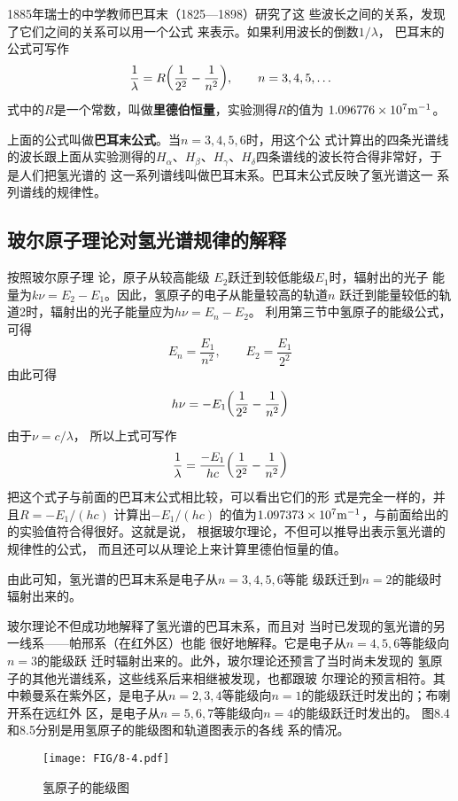1885年瑞士的中学教师巴耳末（1825—1898）研究了这
些波长之间的关系，发现了它们之间的关系可以用一个公式
来表示。如果利用波长的倒数$1/\lambda$，
巴耳末的公式可写作
\[\frac{1}{\lambda}=R\qty(\frac{1}{2^2}-\frac{1}{n^2}),\qquad n=3,4,5,\ldots\]
式中的$R$是一个常数，叫做\textbf{里德伯恒量}，实验测得$R$的值为
$1.096776\times10^7{\rm m^{-1}}$。

上面的公式叫做\textbf{巴耳末公式}。当$n=3,4,5,6$时，用这个公
式计算出的四条光谱线的波长跟上面从实验测得的$H_{\alpha}$、$H_{\beta}$、$H_{\gamma}$、$H_{\delta}$四条谱线的波长符合得非常好，于是人们把氢光谱的
这一系列谱线叫做巴耳末系。巴耳末公式反映了氢光谱这一
系列谱线的规律性。

\subsection{玻尔原子理论对氢光谱规律的解释} 

按照玻尔原子理
论，原子从较高能级 $E_2$跃迁到较低能级$E_1$时，辐射出的光子
能量为$k\nu =E_2-E_1$。因此，氢原子的电子从能量较高的轨道$n$
跃迁到能量较低的轨道2时，辐射出的光子能量应为$h\nu=E_n-E_2$。
利用第三节中氢原子的能级公式，可得
\[E_n=\frac{E_1}{n^2},\qquad E_2=\frac{E_1}{2^2} \]
由此可得\[h\nu=-E_1\qty( \frac{1}{2^2}-\frac{1}{n^2} )\]
由于$\nu=c/\lambda$，
所以上式可写作
\[\frac{1}{\lambda}=\frac{-E_1}{hc}\qty( \frac{1}{2^2}-\frac{1}{n^2})\]
把这个式子与前面的巴耳末公式相比较，可以看出它们的形
式是完全一样的，并且$R=-E_1/(hc)$
计算出$-E_1/(hc)$
的值为$1.097373\times10^7{\rm m^{-1}}$，与前面给出的的实验值符合得很好。这就是说，
根据玻尔理论，不但可以推导出表示氢光谱的规律性的公式，
而且还可以从理论上来计算里德伯恒量的值。

由此可知，氢光谱的巴耳末系是电子从$n=3,4,5,6$等能
级跃迁到$n=2$的能级时辐射出来的。

玻尔理论不但成功地解释了氢光谱的巴耳末系，而且对
当时已发现的氢光谱的另一线系——帕邢系（在红外区）也能
很好地解释。它是电子从$n=4,5,6$等能级向$n=3$的能级跃
迁时辐射出来的。此外，玻尔理论还预言了当时尚未发现的
氢原子的其他光谱线系，这些线系后来相继被发现，也都跟玻
尔理论的预言相符。其中赖曼系在紫外区，是电子从$n=2,
3,4$等能级向$n=1$的能级跃迁时发出的；布喇开系在远红外
区，是电子从$n=5,6,7$等能级向$n=4$的能级跃迁时发出的。
图8.4和8.5分别是用氢原子的能级图和轨道图表示的各线
系的情况。
\begin{figure}[htp]
    \centering
\texttt{[image: FIG/8-4.pdf]}
    \caption{氢原子的能级图}
\end{figure}

